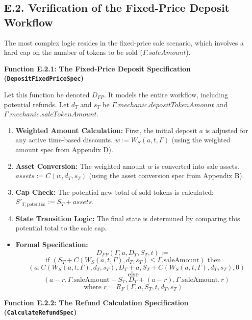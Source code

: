 \documentclass[
  english,
  onecolumn]{article}
\providecommand{\tightlist}{%
  \setlength{\itemsep}{0pt}\setlength{\parskip}{0pt}}
\begin{document}
\subsection{E.2. Verification of the Fixed-Price Deposit
Workflow}\label{e.2.-verification-of-the-fixed-price-deposit-workflow}

The most complex logic resides in the fixed-price sale scenario, which
involves a hard cap on the number of tokens to be sold
(\(\Gamma.saleAmount\)).

\textbf{Function E.2.1: The Fixed-Price Deposit Specification
(\texttt{DepositFixedPriceSpec})}

Let this function be denoted \(D_{FP}\). It models the entire workflow,
including potential refunds. Let \(d_T\) and \(s_T\) be
\(\Gamma.mechanic.depositTokenAmount\) and
\(\Gamma.mechanic.saleTokenAmount\).

\begin{enumerate}
\def\labelenumi{\arabic{enumi}.}
\tightlist
\item
  \textbf{Weighted Amount Calculation:} First, the initial deposit \(a\)
  is adjusted for any active time-based discounts.
  \(w := W_S(a, t, \Gamma)\) (using the weighted amount spec from
  Appendix D).
\item
  \textbf{Asset Conversion:} The weighted amount \(w\) is converted into
  sale assets. \(assets := C(w, d_T, s_T)\) (using the asset conversion
  spec from Appendix B).
\item
  \textbf{Cap Check:} The potential new total of sold tokens is
  calculated: \(S'_{T, \text{potential}} := S_T + assets\).
\item
  \textbf{State Transition Logic:} The final state is determined by
  comparing this potential total to the sale cap.
\end{enumerate}

\begin{itemize}
\tightlist
\item
  \textbf{Formal Specification:} \[
  D_{FP}(\Gamma, a, D_T, S_T, t) :=
  \] \[
  \text{if } (S_T + C(W_S(a, t, \Gamma), d_T, s_T) \le \Gamma.\text{saleAmount}) \text{ then}
  \] \[
  \quad (a, C(W_S(a, t, \Gamma), d_T, s_T), D_T + a, S_T + C(W_S(a, t, \Gamma), d_T, s_T), 0)
  \] \[
  \text{else}
  \] \[
  \quad (a - r, \Gamma.\text{saleAmount} - S_T, D_T + (a-r), \Gamma.\text{saleAmount}, r)
  \] \[
  \text{where } r = R_F(\Gamma, a, S_T, t, d_T, s_T)
  \]
\end{itemize}

\textbf{Function E.2.2: The Refund Calculation Specification
(\texttt{CalculateRefundSpec})}
\end{document}
